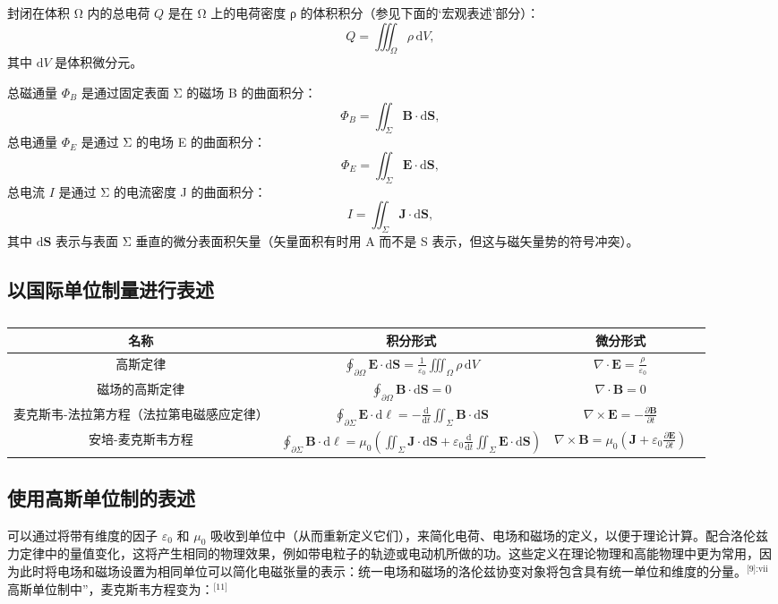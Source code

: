 封闭在体积 Ω 内的总电荷 \( Q \) 是在 Ω 上的电荷密度 ρ 的体积积分（参见下面的‘宏观表述’部分）：
\[
Q = \iiint_{\Omega} \rho \, \mathrm{d} V,~
\]
其中 \( \mathrm{d} V \) 是体积微分元。

总磁通量 \( \Phi_B \) 是通过固定表面 Σ 的磁场 B 的曲面积分：
\[
\Phi_B = \iint_{\Sigma} \mathbf{B} \cdot \mathrm{d} \mathbf{S},~
\]
总电通量 \( \Phi_E \) 是通过 Σ 的电场 E 的曲面积分：
\[
\Phi_E = \iint_{\Sigma} \mathbf{E} \cdot \mathrm{d} \mathbf{S},~
\]
总电流 \( I \) 是通过 Σ 的电流密度 J 的曲面积分：
\[
I = \iint_{\Sigma} \mathbf{J} \cdot \mathrm{d} \mathbf{S},~
\]
其中 \( \mathrm{d} \mathbf{S} \) 表示与表面 Σ 垂直的微分表面积矢量（矢量面积有时用 A 而不是 S 表示，但这与磁矢量势的符号冲突）。

\subsection{以国际单位制量进行表述}
\begin{table}[ht]
\centering
\caption\label{MAXS}
\begin{tabular}{|c|c|c|c|}
\hline
\textbf{名称} & \textbf{积分形式} & \textbf{微分形式}  \\
\hline 高斯定律 & \(\oint_{\partial \Omega} \mathbf{E} \cdot \mathrm{d} \mathbf{S} = \frac{1}{\varepsilon_0} \iiint_{\Omega} \rho \, \mathrm{d}V\) & \(\nabla \cdot \mathbf{E} = \frac{\rho}{\varepsilon_0}\)\\
\hline 磁场的高斯定律 & \(\oint_{\partial \Omega} \mathbf{B} \cdot \mathrm{d} \mathbf{S} = 0\) & \(\nabla \cdot \mathbf{B} = 0\)  \\
\hline 麦克斯韦-法拉第方程（法拉第电磁感应定律） & \(\oint_{\partial \Sigma} \mathbf{E} \cdot \mathrm{d} \ell = - \frac{\mathrm{d}}{\mathrm{d} t} \iint_{\Sigma} \mathbf{B} \cdot \mathrm{d} \mathbf{S}\) & \(\nabla \times \mathbf{E} = - \frac{\partial \mathbf{B}}{\partial t}\) \\
\hline 安培-麦克斯韦方程 & \(\oint_{\partial \Sigma} \mathbf{B} \cdot \mathrm{d} \ell = \mu_0 \left( \iint_{\Sigma} \mathbf{J} \cdot \mathrm{d} \mathbf{S} + \varepsilon_0 \frac{\mathrm{d}}{\mathrm{d} t} \iint_{\Sigma} \mathbf{E} \cdot \mathrm{d} \mathbf{S} \right)\) & \(\nabla \times \mathbf{B} = \mu_0 \left( \mathbf{J} + \varepsilon_0 \frac{\partial \mathbf{E}}{\partial t} \right)\) \\
\hline 
\end{tabular}
\end{table}

\subsection{使用高斯单位制的表述}  
可以通过将带有维度的因子 \( \varepsilon_0 \) 和 \( \mu_0 \) 吸收到单位中（从而重新定义它们），来简化电荷、电场和磁场的定义，以便于理论计算。配合洛伦兹力定律中的量值变化，这将产生相同的物理效果，例如带电粒子的轨迹或电动机所做的功。这些定义在理论物理和高能物理中更为常用，因为此时将电场和磁场设置为相同单位可以简化电磁张量的表示：统一电场和磁场的洛伦兹协变对象将包含具有统一单位和维度的分量。\(^\text{[9]:vii}\) 高斯单位制中”，麦克斯韦方程变为：\(^\text{[11]}\)

